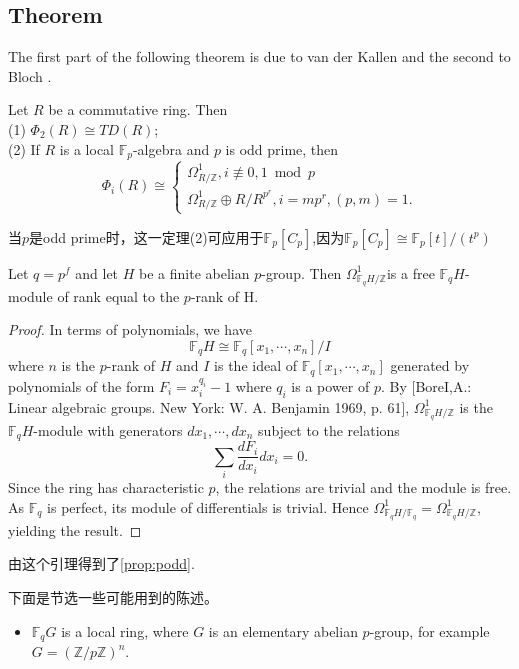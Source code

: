 \subsection{Theorem} %
\label{subsec:theorem}
The first part of the following theorem is due to van der Kallen \cite{MR45:252} and the
second to Bloch \cite{MR81j:14011}.
\begin{theorem}
	Let $R$ be a commutative ring. Then\\
(1) $\Phi_2(R) \cong  TD(R)$;\\
(2) If $R$ is a local $\mathbb{F}_p$-algebra and $p$ is odd prime, then
\[\Phi_i(R)\cong \begin{cases}
	\Omega^1_{R/\mathbb{Z}}, i \not\equiv 0,1 \bmod p\\
	\Omega^1_{R/\mathbb{Z}}\oplus R/R^{p^r}, i=mp^r, (p,m)=1.
\end{cases}\]
\end{theorem}
当$p$是odd prime时，这一定理(2)可应用于$\mathbb{F}_p[C_p]$,因为$\mathbb{F}_p[C_p]\cong \mathbb{F}_p[t]/(t^p)$
\begin{lemma}
	Let $q=p^f$ and let $H$ be a finite abelian $p$-group. Then $\Omega^1_{\mathbb{F}_q H/\mathbb{Z}}$is a free $\mathbb{F}_q H$-module of rank equal to the $p$-rank of H.
\end{lemma}
\begin{proof}
	In terms of polynomials, we have
	\[\mathbb{F}_q H\cong \mathbb{F}_q[x_1,\cdots,x_n]/I\]
where $n$ is the $p$-rank of $H$ and $I$ is the ideal of $\mathbb{F}_q[x_1,\cdots,x_n]$ generated by polynomials of the form  $F_i=x_i^{q_i}-1$ where $q_i$ is a power of $p$. By [BoreI,A.: Linear algebraic groups. New York: W. A. Benjamin 1969, p. 61],  $\Omega^1_{\mathbb{F}_qH/\mathbb{Z}}$
is the $\mathbb{F}_qH$-module with generators  $dx_1,\cdots,dx_n$ subject to the relations
\[\sum_i \frac{d F_i}{d x_i}d x_i =0.\]
Since the ring has characteristic $p$, the relations are trivial and the module is free. 
As $\mathbb{F}_q$ is perfect, its module of differentials is trivial. Hence $\Omega^1_{\mathbb{F}_q H/\mathbb{F}_q}=\Omega^1_{\mathbb{F}_q H/\mathbb{Z}}$,
yielding the result.
\end{proof}

由这个引理得到了\ref{prop:podd}. 

下面是节选一些可能用到的陈述。
\begin{itemize}
	\item  {\color{green} $\mathbb{F}_q G$ is a local ring}, where $G$ is an elementary abelian $p$-group, for example $G=(\mathbb{Z}/p \mathbb{Z})^n$.
\end{itemize}


